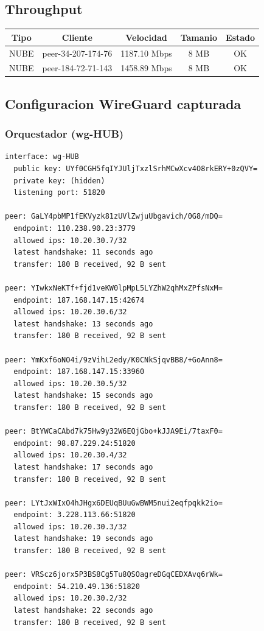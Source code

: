 \documentclass[11pt,a4paper]{article}
\begin{document}
\subsection{Throughput}
\begin{longtable}{|c|c|c|c|c|}
\hline
Tipo & Cliente & Velocidad & Tamanio & Estado \\ \hline
NUBE & peer-34-207-174-76 & 1187.10 Mbps & 8 MB & OK \\ \hline
NUBE & peer-184-72-71-143 & 1458.89 Mbps & 8 MB & OK \\ \hline
\end{longtable}

\subsection{Configuracion WireGuard capturada}
\subsubsection*{Orquestador (wg-HUB)}
\begin{lstlisting}
interface: wg-HUB
  public key: UYf0CGH5fqIYJUljTxzlSrhMCwXcv4O8rkERY+0zQVY=
  private key: (hidden)
  listening port: 51820

peer: GaLY4pbMP1fEKVyzk81zUVlZwjuUbgavich/0G8/mDQ=
  endpoint: 110.238.90.23:3779
  allowed ips: 10.20.30.7/32
  latest handshake: 11 seconds ago
  transfer: 180 B received, 92 B sent

peer: YIwkxNeKTf+fjd1veKW0lpMpL5LYZhW2qhMxZPfsNxM=
  endpoint: 187.168.147.15:42674
  allowed ips: 10.20.30.6/32
  latest handshake: 13 seconds ago
  transfer: 180 B received, 92 B sent

peer: YmKxf6oNO4i/9zVihL2edy/K0CNkSjqvBB8/+GoAnn8=
  endpoint: 187.168.147.15:33960
  allowed ips: 10.20.30.5/32
  latest handshake: 15 seconds ago
  transfer: 180 B received, 92 B sent

peer: BtYWCaCAbd7k75Hw9y32W6EQjGbo+kJJA9Ei/7taxF0=
  endpoint: 98.87.229.24:51820
  allowed ips: 10.20.30.4/32
  latest handshake: 17 seconds ago
  transfer: 180 B received, 92 B sent

peer: LYtJxWIxO4hJHgx6DEUqBUuGwBWM5nui2eqfpqkk2io=
  endpoint: 3.228.113.66:51820
  allowed ips: 10.20.30.3/32
  latest handshake: 19 seconds ago
  transfer: 180 B received, 92 B sent

peer: VRScz6jorx5P3BS8Cg5Tu8QSOagreDGqCEDXAvq6rWk=
  endpoint: 54.210.49.136:51820
  allowed ips: 10.20.30.2/32
  latest handshake: 22 seconds ago
  transfer: 180 B received, 92 B sent

\end{lstlisting}
\end{document}
